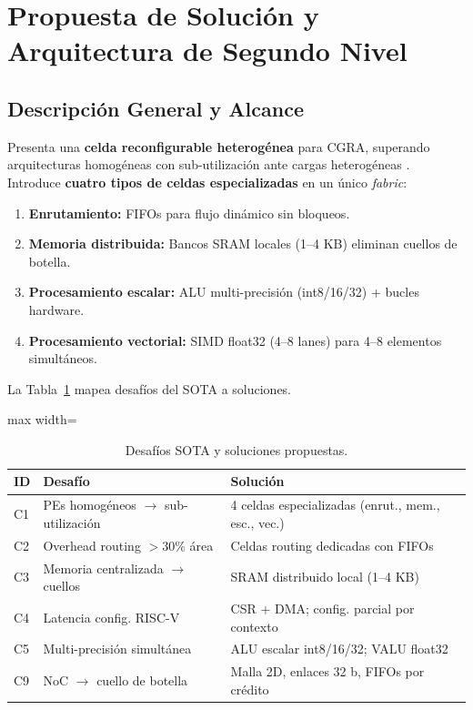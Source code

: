 \documentclass[conference]{IEEEtran}
\begin{document}
\section{Propuesta de Solución y Arquitectura de Segundo Nivel}

\subsection{Descripción General y Alcance}
Presenta una \textbf{celda reconfigurable heterogénea} para CGRA, superando arquitecturas homogéneas con sub-utilización ante cargas heterogéneas \cite{adres2004, hycube2017}. Introduce \textbf{cuatro tipos de celdas especializadas} en un único \textit{fabric}:
\begin{enumerate}
    \item \textbf{Enrutamiento:} FIFOs para flujo dinámico sin bloqueos.
    \item \textbf{Memoria distribuida:} Bancos SRAM locales (1–4 KB) eliminan cuellos de botella.
    \item \textbf{Procesamiento escalar:} ALU multi-precisión (int8/16/32) + bucles hardware.
    \item \textbf{Procesamiento vectorial:} SIMD float32 (4–8 lanes) para 4–8 elementos simultáneos.
\end{enumerate}

La Tabla~\ref{tab:desafios_soluciones} mapea desafíos del SOTA a soluciones.

\begin{table}[htbp]
\centering
\caption{Desafíos SOTA y soluciones propuestas.}
\label{tab:desafios_soluciones}
\normalsize
\begin{adjustbox}{max width=\columnwidth}
\begin{tabular}{@{}p{}p{}p{}@{}}
	\textbf{ID} & \textbf{Desafío} & \textbf{Solución} \\
\midrule
C1 & PEs homogéneos $\to$ sub-utilización & 4 celdas especializadas (enrut., mem., esc., vec.) \\
C2 & Overhead routing $>30\%$ área & Celdas routing dedicadas con FIFOs \\
C3 & Memoria centralizada $\to$ cuellos & SRAM distribuido local (1--4 KB) \\
C4 & Latencia config. RISC-V & CSR + DMA; config. parcial por contexto \\
C5 & Multi-precisión simultánea & ALU escalar int8/16/32; VALU float32 \\
C9 & NoC $\to$ cuello de botella & Malla 2D, enlaces 32 b, FIFOs por crédito \\
\bottomrule
\end{tabular}
\end{adjustbox}
\end{table}
\end{document}
